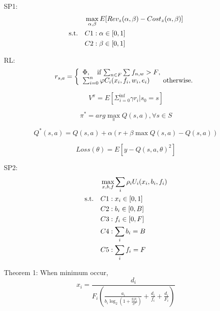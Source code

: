 \documentclass{article}
\begin{document}
SP1:
\begin{align}\
& \max_{\alpha, \beta} E[ Rev_{z}(\alpha, \beta) - Cost_{z}(\alpha, \beta) ] \nonumber\\
\rm{s.t.} \quad &C1: \alpha \in [0,1] \nonumber\\ 
\quad &C2: \beta \in [0,1] \nonumber\\
\end{align}

RL:
\begin{equation}
r_{s,a} = \left\{
	\begin{array}{ll}   
	\Phi, \quad \mbox{if $ \sum_{n \in F} \sum_{} f_{n,w} > F$}, \\
    \sum_{i=0}^{n} \varphi C_{i} (x_{i}, f_{i}, w_{i}, e_{i}) \qquad \mbox{otherwise.}
	\end{array}
\right.
\end{equation}

\begin{equation}
V^{\pi}=E[ \Sigma_{i=0}^{\inf} \gamma r_{i} \vert s_{0}=s ]
\end{equation}

\begin{equation}
\pi^{*}=arg \max_{\pi}  Q(s,a), \forall s \in S
\end{equation}

\begin{equation}
Q^{*}(s,a)=Q(s,a)+\alpha( r + \beta \max Q(s,a) - Q(s,a))
\end{equation}

\begin{equation}
Loss(\theta)=E[ y - Q(s,a,\theta)^{2}]
\end{equation}

SP2:
\begin{align}\
& \max_{x,b,f} \sum_{i}\rho_{i}U_{i}(x_{i},b_{i},f_{i})  \nonumber\\
\rm{s.t.} \quad &C1: x_{i} \in [0,1] \nonumber\\ 
\quad &C2: b_{i} \in [0,B] \nonumber\\
\quad &C3: f_{i} \in [0,F] \nonumber\\
\quad &C4: \sum_{i}b_{i}=B \nonumber\\
\quad &C5: \sum_{i}f_{i}=F \nonumber\\
\end{align}

Theorem 1:
When minimum occur, 
\begin{equation}
x_{i}=\frac{d_{i}}{ F_{i}(\frac{a_{i}}{b_{i}\log_{2}{ (1+\frac{g_{i}p_{i}}{ \sigma^{2} } )}} + \frac{d_{i}}{f_{i}}+\frac{d_{i}}{F_{i}}) }
\end{equation}
\end{document}
